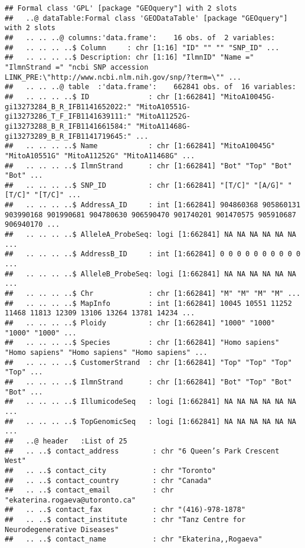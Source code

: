 \documentclass[
]{article}
\begin{document}
\begin{verbatim}
## Formal class 'GPL' [package "GEOquery"] with 2 slots
##   ..@ dataTable:Formal class 'GEODataTable' [package "GEOquery"] with 2 slots
##   .. .. ..@ columns:'data.frame':    16 obs. of  2 variables:
##   .. .. .. ..$ Column     : chr [1:16] "ID" "" "" "SNP_ID" ...
##   .. .. .. ..$ Description: chr [1:16] "IlmnID" "Name =" "IlmnStrand =" "ncbi SNP accession LINK_PRE:\"http://www.ncbi.nlm.nih.gov/snp/?term=\"" ...
##   .. .. ..@ table  :'data.frame':    662841 obs. of  16 variables:
##   .. .. .. ..$ ID              : chr [1:662841] "MitoA10045G-gi13273284_B_R_IFB1141652022:" "MitoA10551G-gi13273286_T_F_IFB1141639111:" "MitoA11252G-gi13273288_B_R_IFB1141661584:" "MitoA11468G-gi13273289_B_R_IFB1141719645:" ...
##   .. .. .. ..$ Name            : chr [1:662841] "MitoA10045G" "MitoA10551G" "MitoA11252G" "MitoA11468G" ...
##   .. .. .. ..$ IlmnStrand      : chr [1:662841] "Bot" "Top" "Bot" "Bot" ...
##   .. .. .. ..$ SNP_ID          : chr [1:662841] "[T/C]" "[A/G]" "[T/C]" "[T/C]" ...
##   .. .. .. ..$ AddressA_ID     : int [1:662841] 904860368 905860131 903990168 901990681 904780630 906590470 901740201 901470575 905910687 906940170 ...
##   .. .. .. ..$ AlleleA_ProbeSeq: logi [1:662841] NA NA NA NA NA NA ...
##   .. .. .. ..$ AddressB_ID     : int [1:662841] 0 0 0 0 0 0 0 0 0 0 ...
##   .. .. .. ..$ AlleleB_ProbeSeq: logi [1:662841] NA NA NA NA NA NA ...
##   .. .. .. ..$ Chr             : chr [1:662841] "M" "M" "M" "M" ...
##   .. .. .. ..$ MapInfo         : int [1:662841] 10045 10551 11252 11468 11813 12309 13106 13264 13781 14234 ...
##   .. .. .. ..$ Ploidy          : chr [1:662841] "1000" "1000" "1000" "1000" ...
##   .. .. .. ..$ Species         : chr [1:662841] "Homo sapiens" "Homo sapiens" "Homo sapiens" "Homo sapiens" ...
##   .. .. .. ..$ CustomerStrand  : chr [1:662841] "Top" "Top" "Top" "Top" ...
##   .. .. .. ..$ IlmnStrand      : chr [1:662841] "Bot" "Top" "Bot" "Bot" ...
##   .. .. .. ..$ IllumicodeSeq   : logi [1:662841] NA NA NA NA NA NA ...
##   .. .. .. ..$ TopGenomicSeq   : logi [1:662841] NA NA NA NA NA NA ...
##   ..@ header   :List of 25
##   .. ..$ contact_address        : chr "6 Queen’s Park Crescent West"
##   .. ..$ contact_city           : chr "Toronto"
##   .. ..$ contact_country        : chr "Canada"
##   .. ..$ contact_email          : chr "ekaterina.rogaeva@utoronto.ca"
##   .. ..$ contact_fax            : chr "(416)-978-1878"
##   .. ..$ contact_institute      : chr "Tanz Centre for Neurodegenerative Diseases"
##   .. ..$ contact_name           : chr "Ekaterina,,Rogaeva"

\end{verbatim}
\end{document}

